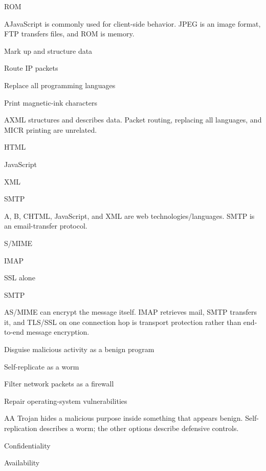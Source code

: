 \begin{enumerate}[label=\textbf{Q\arabic*.}, leftmargin=*]
{   \item ROM}
  {A}{JavaScript is commonly used for client-side behavior. JPEG is an image format, FTP transfers files, and ROM is memory.}
  {\item Mark up and structure data
   \item Route IP packets
   \item Replace all programming languages
   \item Print magnetic-ink characters}
  {A}{XML structures and describes data. Packet routing, replacing all languages, and MICR printing are unrelated.}
  {\item HTML
   \item JavaScript
   \item XML
   \item SMTP}
  {A, B, C}{HTML, JavaScript, and XML are web technologies/languages. SMTP is an email-transfer protocol.}
\fi
\ifnum{}
  {\item S/MIME
   \item IMAP
   \item SSL alone
   \item SMTP}
  {A}{S/MIME can encrypt the message itself. IMAP retrieves mail, SMTP transfers it, and TLS/SSL on one connection hop is transport protection rather than end-to-end message encryption.}
  {\item Disguise malicious activity as a benign program
   \item Self-replicate as a worm
   \item Filter network packets as a firewall
   \item Repair operating-system vulnerabilities}
  {A}{A Trojan hides a malicious purpose inside something that appears benign. Self-replication describes a worm; the other options describe defensive controls.}
  {\item Confidentiality
   \item Availability
}
\end{enumerate}
